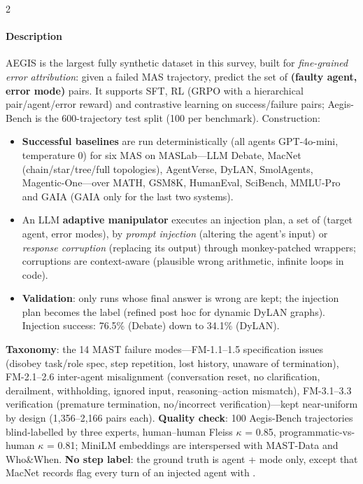 \begin{multicols}{2}
\paragraph{Description} AEGIS is the largest fully synthetic dataset in this survey, built for \emph{fine-grained error attribution}: given a failed MAS trajectory, predict the set of \textbf{(faulty agent, error mode)} pairs. It supports SFT, RL (GRPO with a hierarchical pair/agent/error reward) and contrastive learning on success/failure pairs; Aegis-Bench is the 600-trajectory test split (100 per benchmark). Construction:
\begin{itemize}
\item \textbf{Successful baselines} are run deterministically (all agents GPT-4o-mini, temperature 0) for six MAS on MASLab---LLM Debate, MacNet (chain/star/tree/full topologies), AgentVerse, DyLAN, SmolAgents, Magentic-One---over MATH, GSM8K, HumanEval, SciBench, MMLU-Pro and GAIA (GAIA only for the last two systems).
\item An LLM \textbf{adaptive manipulator} executes an injection plan, a set of (target agent, error modes), by \emph{prompt injection} (altering the agent's input) or \emph{response corruption} (replacing its output) through monkey-patched wrappers; corruptions are context-aware (plausible wrong arithmetic, infinite loops in code).
\item \textbf{Validation}: only runs whose final answer is wrong are kept; the injection plan becomes the label (refined post hoc for dynamic DyLAN graphs). Injection success: 76.5\% (Debate) down to 34.1\% (DyLAN).
\end{itemize}
\textbf{Taxonomy}: the 14 MAST failure modes---FM-1.1--1.5 specification issues (disobey task/role spec, step repetition, lost history, unaware of termination), FM-2.1--2.6 inter-agent misalignment (conversation reset, no clarification, derailment, withholding, ignored input, reasoning--action mismatch), FM-3.1--3.3 verification (premature termination, no/incorrect verification)---kept near-uniform by design (1,356--2,166 pairs each). \textbf{Quality check}: 100 Aegis-Bench trajectories blind-labelled by three experts, human--human Fleiss $\kappa$ = 0.85, programmatic-vs-human $\kappa$ = 0.81; MiniLM embeddings are interspersed with MAST-Data and Who\&When. \textbf{No step label}: the ground truth is agent + mode only, except that MacNet records flag every turn of an injected agent with .


\end{multicols}
